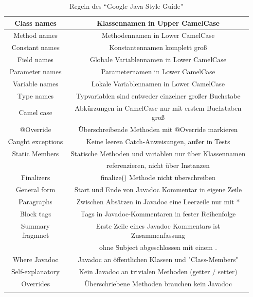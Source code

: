 \documentclass[da,ngerman]{stthesis}
\begin{document}
\begin{center}
\begin{longtabu}{|c|c|}
						\hline
						Class names & Klassennamen in Upper CamelCase \\
						\hline
						Method names & Methodennamen in Lower CamelCase \\
						\hline
						Constant names & Konstantennamen komplett groß \\
						\hline
						Field names & Globale Variablennamen in Lower CamelCase \\
						\hline
						Parameter names & Parameternamen in Lower CamelCase \\
						\hline
						Variable names & Lokale Variablennamen in Lower CamelCase \\
						\hline
						Type names & Typvariablen sind entweder einzelner großer Buchstabe \\
						\hline
						Camel case & Abkürzungen in CamelCase nur mit erstem Buchstaben groß \\
						\hline
						@Override & Überschreibende Methoden mit @Override markieren \\
						\hline
						Caught exceptions & Keine leeren Catch-Anweisungen, außer in Tests \\
						\hline
						Static Members & Statische Methoden und variablen nur über Klassennamen \\ & referenzieren, nicht über Instanzen \\
						\hline
						Finalizers & finalize() Methode nicht überschreiben \\
						\hline
						General form & Start und Ende von Javadoc Kommentar in eigene Zeile \\
						\hline
						Paragraphs & Zwischen Absätzen in Javadoc eine Leerzeile nur mit * \\
						\hline
						Block tags & Tags in Javadoc-Kommentaren in fester Reihenfolge \\
						\hline
						Summary fragmnet & Erste Zeile eines Javadoc Kommentars ist Zusammenfassung \\ & ohne Subject abgeschlossen mit einem . \\
						\hline
						Where Javadoc & Javadoc an öffentlichen Klassen und "Class-Members" \\
						\hline
						Self-explanatory & Kein Javadoc an trivialen Methoden (getter / setter) \\
						\hline
						Overrides & Überschriebene Methoden brauchen kein Javadoc \\
						\hline
  						\caption{Regeln des "`Google Java Style Guide"'  \cite{GoogleStyleGuide}}
						\label{googlerules}
  					\end{longtabu}   
  				\end{center}
\end{document}
